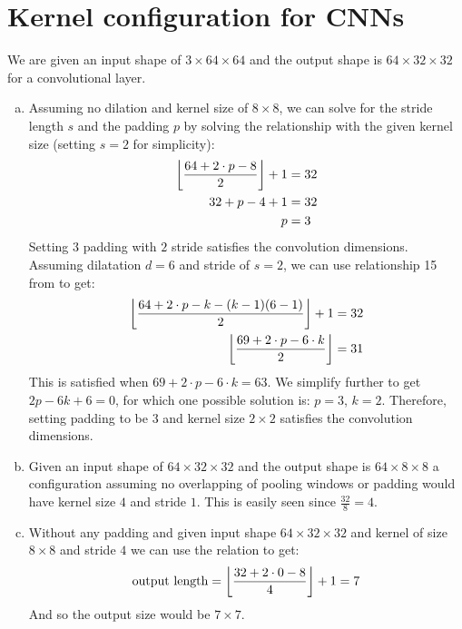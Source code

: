 \documentclass[paper=a4, fontsize=11pt]{scrartcl} %
\numberwithin{equation}{section} %
\numberwithin{figure}{section} %
\numberwithin{table}{section} %
\DeclarePairedDelimiter\floor{\lfloor}{\rfloor}
\begin{document}
\section{Kernel configuration for CNNs}
We are given an input shape of $3\times64\times64$ and the output shape
is $64\times32\times32$ for a convolutional layer.
\begin{enumerate}[(a)]
	\item Assuming no dilation and kernel size of $8\times8$, we can solve for the stride length $s$ and the padding $p$ by solving the relationship with the given kernel size (setting $s=2$ for simplicity):
	\begin{align*}
	\floor*{\frac{64+2\cdot p-8}{2}}+1&=32\\
	32+p-4+1&=32\\
	p&=3
	\end{align*}
	Setting $3$ padding with $2$ stride satisfies the convolution dimensions. Assuming dilatation $d=6$ and stride of $s=2$, we can use relationship 15 from \cite{journals/corr/DumoulinV16} to get:
	\begin{align*}
		\floor*{\frac{64+2\cdot p-k-(k-1)(6-1)}{2}}+1&=32\\
		\floor*{\frac{69+2\cdot p-6\cdot k}{2}}&=31\\
	\end{align*}
	This is satisfied when $69+2\cdot p-6\cdot k = 63$. We simplify further to get $2p-6k+6=0$, for which one possible solution is: $p=3$, $k=2$. Therefore, setting padding to be $3$ and kernel size $2\times2$ satisfies the convolution dimensions.
	\item Given an input shape of $64\times32 \times32$ and the output shape
	is $64\times8 \times8$ a configuration assuming no overlapping of pooling windows or padding would have kernel size $4$ and stride $1$. This is easily seen since $\frac{32}{8}=4$.
	\item Without any padding and given input shape $64\times32 \times32$ and kernel of size $8\times8$ and stride $4$ we can use the relation to get:
	$$\text{output length}=\floor*{\frac{32+2\cdot0-8}{4}}+1=7$$
	And so the output size would be $7\times7$.
\end{enumerate}


\newpage



\end{document}

